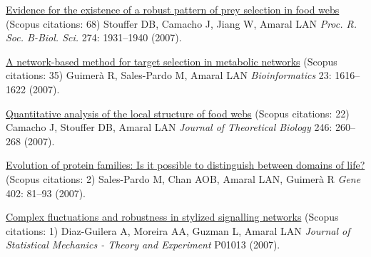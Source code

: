 \NumberedItem{\makebox[0.8cm][r]{[70]}}
\href{/people/amaral/evidence-for-the-existence-of-a-robust-pattern-of-prey-selection-in-food-webs}
{Evidence for the existence of a robust pattern of prey selection in food webs}
    (Scopus citations: 68)
\newline
Stouffer DB, Camacho J, Jiang W, Amaral LAN
\newline
\textit{Proc. R. Soc. B-Biol. Sci.}
    274:
1931--1940 (2007).
\newline
\Gap
~
\Gap

\NumberedItem{\makebox[0.8cm][r]{[69]}}
\href{/people/amaral/a-network-based-method-for-target-selection-in-metabolic-networks}
{A network-based method for target selection in metabolic networks}
    (Scopus citations: 35)
\newline
Guimer\`a R, Sales-Pardo M, Amaral LAN
\newline
\textit{Bioinformatics}
    23:
1616--1622 (2007).
\newline
\Gap
~
\Gap

\NumberedItem{\makebox[0.8cm][r]{[68]}}
\href{/people/amaral/quantitative-analysis-of-the-local-structure-of-food-webs}
{Quantitative analysis of the local structure of food webs}
    (Scopus citations: 22)
\newline
Camacho J, Stouffer DB, Amaral LAN
\newline
\textit{Journal of Theoretical Biology}
    246:
260--268 (2007).
\newline
\Gap
~
\Gap

\NumberedItem{\makebox[0.8cm][r]{[67]}}
\href{/people/amaral/evolution-of-protein-families-is-it-possible-to-distinguish-between-domains-of-life}
{Evolution of protein families: Is it possible to distinguish between domains of life?}
    (Scopus citations: 2)
\newline
Sales-Pardo M, Chan AOB, Amaral LAN, Guimer\`a R
\newline
\textit{Gene}
    402:
81--93 (2007).
\newline
\Gap
~
\Gap

\NumberedItem{\makebox[0.8cm][r]{[66]}}
\href{/people/amaral/complex-fluctuations-and-robustness-in-stylized-signalling-networks}
{Complex fluctuations and robustness in stylized signalling networks}
    (Scopus citations: 1)
\newline
Diaz-Guilera A, Moreira AA, Guzman L, Amaral LAN
\newline
\textit{Journal of Statistical Mechanics - Theory and Experiment}
P01013 (2007).
\newline
\Gap
~
\Gap

